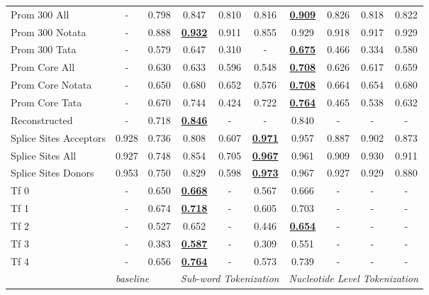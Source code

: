 \begin{table*}[h!]
\begin{center}
\begin{tabular}{l|cc|ccc|cccc}
Prom 300 All & - & 0.798 & 0.847 & 0.810 & 0.816 & {\ul \textbf{0.909}} & 0.826 & 0.818 & 0.822 \\
Prom 300 Notata & - & 0.888 & {\ul \textbf{0.932}} & 0.911 & 0.855 & 0.929 & 0.918 & 0.917 & 0.929 \\
Prom 300 Tata & - & 0.579 & 0.647 & 0.310 & - & {\ul \textbf{0.675}} & 0.466 & 0.334 & 0.580 \\
Prom Core All & - & 0.630 & 0.633 & 0.596 & 0.548 & {\ul \textbf{0.708}} & 0.626 & 0.617 & 0.659 \\
Prom Core Notata & - & 0.650 & 0.680 & 0.652 & 0.576 & {\ul \textbf{0.708}} & 0.664 & 0.654 & 0.680 \\
Prom Core Tata & - & 0.670 & 0.744 & 0.424 & 0.722 & {\ul \textbf{0.764}} & 0.465 & 0.538 & 0.632 \\
Reconstructed & - & 0.718 & {\ul \textbf{0.846}} & - & - & 0.840 & - & - & - \\
Splice Sites Acceptors & 0.928 & 0.736 & 0.808 & 0.607 & {\ul \textbf{0.971}} & 0.957 & 0.887 & 0.902 & 0.873 \\
Splice Sites All & 0.927 & 0.748 & 0.854 & 0.705 & {\ul \textbf{0.967}} & 0.961 & 0.909 & 0.930 & 0.911 \\
Splice Sites Donors & 0.953 & 0.750 & 0.829 & 0.598 & {\ul \textbf{0.973}} & 0.967 & 0.927 & 0.929 & 0.880 \\
Tf 0 & - & 0.650 & {\ul \textbf{0.668}} & - & 0.567 & 0.666 & - & - & - \\
Tf 1 & - & 0.674 & {\ul \textbf{0.718}} & - & 0.605 & 0.703 & - & - & - \\
Tf 2 & - & 0.527 & 0.652 & - & 0.446 & {\ul \textbf{0.654}} & - & - & - \\
Tf 3 & - & 0.383 & {\ul \textbf{0.587}} & - & 0.309 & 0.551 & - & - & - \\
Tf 4 & - & 0.656 & {\ul \textbf{0.764}} & - & 0.573 & 0.739 & - & - & - \\
\hline
 & \multicolumn{2}{l|}{\textit{baseline}} & \multicolumn{3}{c|}{\textit{Sub-word Tokenization}} & \multicolumn{4}{c}{\textit{Nucleotide Level Tokenization}} \\ \hline
\end{tabular}
\end{center}
\end{table*}